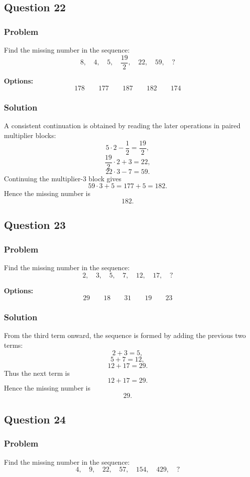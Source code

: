 \documentclass[12pt]{article}
\begin{document}
\subsection{Question 22}
\subsubsection{Problem}
Find the missing number in the sequence:
\[
8,\quad 4,\quad 5,\quad \frac{19}{2},\quad 22,\quad 59,\quad ?
\]

\noindent\textbf{Options:}
\[
\boxed{178}
\qquad
\boxed{177}
\qquad
\boxed{187}
\qquad
\boxed{182}
\qquad
\boxed{174}
\]

\subsubsection{Solution}
A consistent continuation is obtained by reading the later operations in paired multiplier blocks:
\[
5\cdot 2-\frac{1}{2}=\frac{19}{2},
\]
\[
\frac{19}{2}\cdot 2+3=22,
\]
\[
22\cdot 3-7=59.
\]
Continuing the multiplier-\(3\) block gives
\[
59\cdot 3+5=177+5=182.
\]
Hence the missing number is
\[
\boxed{182}.
\]

\subsection{Question 23}
\subsubsection{Problem}
Find the missing number in the sequence:
\[
2,\quad 3,\quad 5,\quad 7,\quad 12,\quad 17,\quad ?
\]

\noindent\textbf{Options:}
\[
\boxed{29}
\qquad
\boxed{18}
\qquad
\boxed{31}
\qquad
\boxed{19}
\qquad
\boxed{23}
\]

\subsubsection{Solution}
From the third term onward, the sequence is formed by adding the previous two terms:
\[
2+3=5,
\]
\[
5+7=12,
\]
\[
12+17=29.
\]
Thus the next term is
\[
12+17=29.
\]
Hence the missing number is
\[
\boxed{29}.
\]

\subsection{Question 24}
\subsubsection{Problem}
Find the missing number in the sequence:
\[
4,\quad 9,\quad 22,\quad 57,\quad 154,\quad 429,\quad ?
\]
\end{document}
